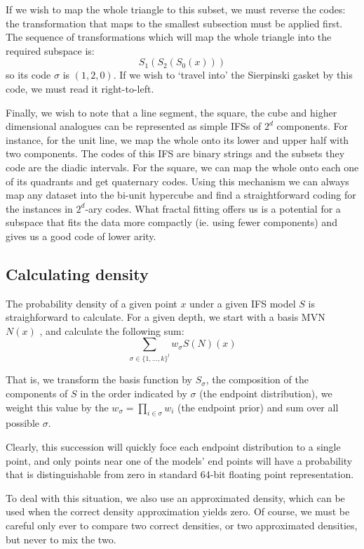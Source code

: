 \documentclass[10pt,a4paper,oneside]{article}
\theoremstyle{definition}
\begin{document}
If we wish to map the whole triangle to this subset, we must reverse the codes: the transformation that maps to the smallest subsection must be applied first. The sequence of transformations which will map the whole triangle into the required subspace is:
\[
S_1(S_2(S_0(x)))
\]
so its code $\sigma$ is $(1, 2, 0)$. If we wish to `travel into' the Sierpinski gasket by this code, we must read it right-to-left.

Finally, we wish to note that a line segment, the square, the cube and higher dimensional analogues can be represented as simple IFSs of $2^d$ components. For instance, for the unit line, we map the whole onto its lower and upper half with two components. The codes of this IFS are binary strings and the subsets they code are the diadic intervals. For the square, we can map the whole onto each one of its quadrants and get quaternary codes. Using this mechanism we can always map any dataset into the bi-unit hypercube and find a straightforward coding for the instances in $2^d$-ary codes. What fractal fitting offers us is a potential for a subspace that fits the data more compactly (ie. using fewer components) and gives us a good code of lower arity.

\subsection*{Calculating density}
\label{sec:density}

The probability density of a given point $x$ under a given IFS model $S$ is straighforward to calculate. For a given depth, we start with a basis MVN $N(x)$ , and calculate the following sum:
\[
\sum_{\sigma \in \{1, \ldots, k\}^l} w_\sigma S(N)(x)
\]

That is, we transform the basis function by $S_\sigma$, the composition of the components of $S$ in the order indicated by $\sigma$ (the endpoint distribution), we weight this value by the $w_\sigma = \prod_{i \in \sigma} w_i$ (the endpoint prior) and sum over all possible $\sigma$.

Clearly, this succession will quickly foce each endpoint distribution to a single point, and only points near one of the models' end points will have a probability that is distinguishable from zero in standard 64-bit floating point representation.

To deal with this situation, we also use an approximated density, which can be used when the correct density approximation yields zero. Of course, we must be careful only ever to compare two correct densities, or two approximated densities, but never to mix the two.
\end{document}
